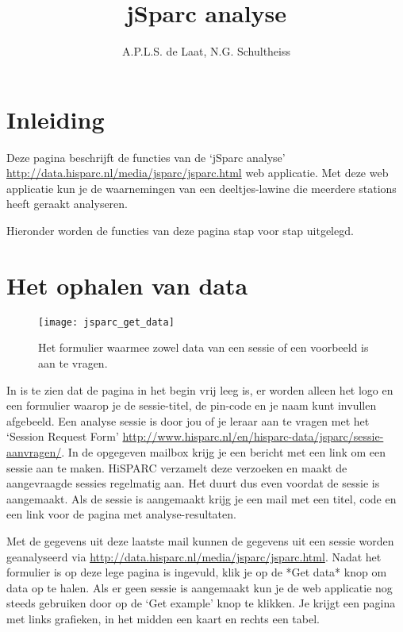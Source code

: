 

\title{jSparc analyse}
\author{A.P.L.S. de Laat, N.G. Schultheiss}



\maketitle

\section{Inleiding}

Deze pagina beschrijft de functies van de `jSparc analyse' 
\url{http://data.hisparc.nl/media/jsparc/jsparc.html} web
applicatie. Met deze web applicatie kun je de waarnemingen van een 
deeltjes-lawine die meerdere stations heeft geraakt analyseren.

Hieronder worden de functies van deze pagina stap voor stap uitgelegd.

\section{Het ophalen van data}

\begin{figure}[H]
    \centering
    \texttt{[image: jsparc\_get\_data]}
    \caption{Het formulier waarmee zowel data van een sessie of een voorbeeld is aan te 
   		vragen.}
    \label{fig:get_data}
\end{figure}

In  is te zien dat de pagina in het begin vrij leeg is, er worden alleen het \hisparc logo en een
formulier waarop je de sessie-titel, de pin-code en je naam kunt invullen 
afgebeeld. Een analyse sessie is door jou of je leraar aan te vragen met het 
`Session Request Form'
\url{http://www.hisparc.nl/en/hisparc-data/jsparc/sessie-aanvragen/}. In de opgegeven mailbox krijg je een bericht met een link om een sessie aan te maken. HiSPARC verzamelt deze verzoeken en maakt de aangevraagde sessies regelmatig aan. Het duurt dus even voordat de sessie is aangemaakt. Als de sessie is aangemaakt krijg je een mail met een titel, code en een link voor de pagina met analyse-resultaten.

Met de gegevens uit deze laatste mail kunnen de gegevens uit een sessie worden geanalyseerd via \url{http://data.hisparc.nl/media/jsparc/jsparc.html}. Nadat het formulier is op deze lege pagina is ingevuld, klik je op de *Get data* knop 
om data op te halen. Als er geen sessie is aangemaakt kun je de web applicatie 
nog steeds gebruiken door op de `Get example' knop te klikken. Je krijgt een pagina met links grafieken, in het midden een kaart en rechts een tabel.

